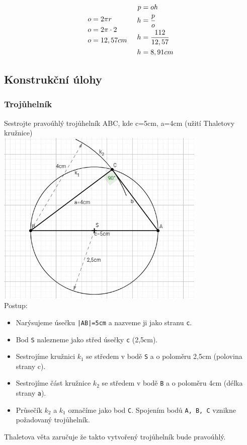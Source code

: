 \documentclass[12pt]{article}
\begin{document}
\begin{multicols}{2}
\begin{equation}
\begin{split}
\nonumber
o&=2\pi r\\
o&=2\pi \cdot 2\\
o&=12,57cm
\end{split}
\hspace{0,5cm}
\begin{split}
\nonumber
p&=oh\\
h&=\frac{p}{o}\\
h&=\frac{112}{12,57}\\
h&=8,91cm
\end{split}
\end{equation}
\end{multicols}

\pagebreak
\subsection{Konstrukční úlohy}
\subsubsection{Trojůhelník}
Sestrojte pravoúhlý trojůhelník ABC, kde c=5cm, a=4cm (užití Thaletovy kružnice)\\
\includegraphics[width=10cm]{thalet.png}\\
Postup:
\begin{itemize}
\setlength\itemsep{1px}
\item Narýsujeme úsečku \texttt{|AB|=5cm} a nazveme ji jako stranu \texttt{c}.
\item Bod \texttt{S} nalezneme jako střed úsečky \texttt{c} (2,5cm).
\item Sestrojíme kružnici $ k_{1} $ se středem v bodě \texttt{S} a o poloměru 2,5cm (polovina strany c).
\item Sestrojíme část kružnice $ k_{2} $ se středem v bodě \texttt{B} a o poloměru 4cm (délka strany \texttt{a}).
\item Průsečík $ k_{2} $ a $ k_{1} $ označíme jako bod \texttt{C}. Spojením bodů \texttt{A, B, C} vznikne požadovaný trojůhelník.
\end{itemize}
Thaletova věta zaručuje že takto vytvořený trojůhelník bude pravoúhlý.
\end{document}
